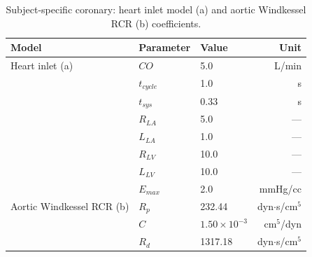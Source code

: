 \documentclass[master,english,final]{kaist-ucs}
\begin{document}
\begin{table}[ht]
\caption[Subject-specific coronary inlet and aortic outlet BC]{Subject-specific coronary: heart inlet model (a) and aortic Windkessel RCR (b) coefficients.}
\label{tab:bc-heart-aorta}
\begin{center}
\begin{tabular}{lllr}
\hline\hline
Model & Parameter & Value & Unit \\
\hline
Heart inlet (a) & $CO$        & 5.0    & L/min \\
                & $t_{cycle}$ & 1.0    & s \\
                & $t_{sys}$   & 0.33   & s \\
                & $R_{LA}$    & 5.0    & --- \\
                & $L_{LA}$    & 1.0    & --- \\
                & $R_{LV}$    & 10.0   & --- \\
                & $L_{LV}$    & 10.0   & --- \\
                & $E_{max}$   & 2.0    & mmHg/cc \\
Aortic Windkessel RCR (b) & $R_p$ & 232.44              & dyn$\cdot$s/cm$^5$ \\
                          & $C$   & $1.50\times10^{-3}$ & cm$^5$/dyn \\
                          & $R_d$ & 1317.18             & dyn$\cdot$s/cm$^5$ \\
\hline\hline
\end{tabular}
\end{center}
\end{table}
\end{document}
